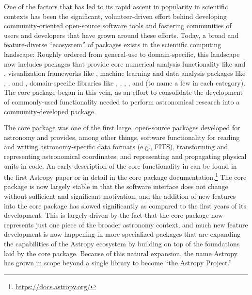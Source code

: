\documentclass[modern]{aastex631}
\begin{document}
One of the factors that has led to its rapid ascent in popularity in scientific
contexts has been the significant, volunteer-driven effort behind developing
community-oriented open-source software tools and fostering communities of users
and developers that have grown around these efforts.
Today, a broad and feature-diverse ``ecosystem'' of packages exists in the
\python scientific computing landscape: Roughly ordered from general-use to
domain-specific, this landscape now includes packages that provide core
numerical analysis functionality like  \citep{numpy:nature} and
 \citep{scipy}, visualization frameworks like
 \citep{matplotlib}, machine learning and data analysis
packages like  \citep{tensorflow}, 
\citep{Salvatier:2016}, and  \citep{emcee}, domain-specific
libraries like  \citep{yt:2011}, 
\citep{plasmapy},  \citep{sunpy:apj}, 
\citep{biopython}, and  \citep{sympy} (to name a few in each
category).
The \astropypkg \citep{astropy:2013, astropy:2018} core package began in this
vein, as an effort to consolidate the development of commonly-used functionality
needed to perform astronomical research into a community-developed \python
package.

The \astropypkg core package was one of the first large, open-source \python
packages developed for astronomy and provides, among other things, software
functionality for reading and writing astronomy-specific data formats (e.g.,
FITS), transforming and representing astronomical coordinates, and representing
and propagating physical units in code.
An early description of the core functionality in \astropypkg can be found in
the first Astropy paper \citep{astropy:2013} or in detail in the core package
documentation.\footnote{\url{https://docs.astropy.org/}}
The \astropypkg core package is now largely stable in that the software
interface does not change without sufficient and significant motivation, and the
addition of new features into the core package has slowed significantly as
compared to the first years of its development.
This is largely driven by the fact that the core package now represents just one
piece of the broader astronomy \python context, and much new feature development
is now happening in more specialized packages that are expanding the
capabilities of the Astropy ecosystem by building on top of the foundations laid
by the \astropypkg core package.
Because of this natural expansion, the name Astropy has grown in scope beyond a
single \python library to become ``the Astropy Project.''
\end{document}
